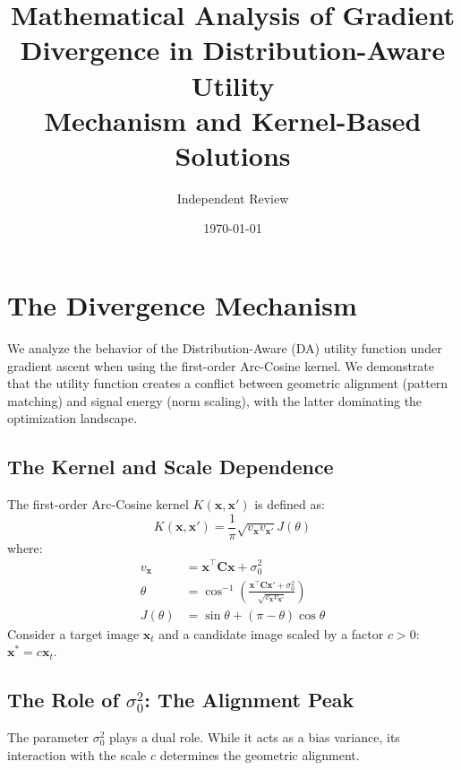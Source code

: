 \documentclass[11pt]{article}
\title{Mathematical Analysis of Gradient Divergence in Distribution-Aware Utility \\ \large Mechanism and Kernel-Based Solutions}
\author{Independent Review}
\date{\today}
\newcommand{\bx}{\mathbf{x}}
\newcommand{\bC}{\mathbf{C}}
\begin{document}
\maketitle

\section{The Divergence Mechanism}

We analyze the behavior of the Distribution-Aware (DA) utility function under gradient ascent when using the first-order Arc-Cosine kernel. We demonstrate that the utility function creates a conflict between geometric alignment (pattern matching) and signal energy (norm scaling), with the latter dominating the optimization landscape.

\subsection{The Kernel and Scale Dependence}
The first-order Arc-Cosine kernel $K(\bx, \bx')$ is defined as:
\begin{equation}
    K(\bx, \bx') = \frac{1}{\pi} \sqrt{v_{\bx} v_{\bx'}} J(\theta)
\end{equation}
where:
\begin{align}
    v_{\bx} &= \bx^\top \bC \bx + \sigma_0^2 \\
    \theta &= \cos^{-1}\left( \frac{\bx^\top \bC \bx' + \sigma_0^2}{\sqrt{v_{\bx} v_{\bx'}}} \right) \\
    J(\theta) &= \sin \theta + (\pi - \theta) \cos \theta
\end{align}
Consider a target image $\bx_t$ and a candidate image scaled by a factor $c > 0$: $\bx^* = c \bx_t$.

\subsection{The Role of $\sigma_0^2$: The Alignment Peak}
The parameter $\sigma_0^2$ plays a dual role. While it acts as a bias variance, its interaction with the scale $c$ determines the geometric alignment.
\end{document}

